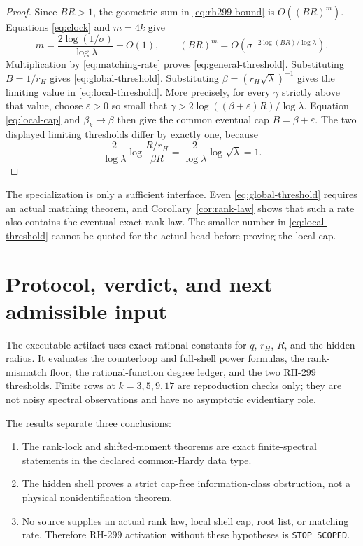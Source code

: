 \documentclass[11pt]{article}
\theoremstyle{remark}
\begin{document}
\begin{proof}
Since $BR>1$, the geometric sum in \eqref{eq:rh299-bound} is
$O((BR)^m)$.  Equations \eqref{eq:clock} and $m=4k$ give
\begin{equation}\label{eq:clock-growth}
 m=\frac{2\log(1/\sigma)}{\log\lambda}+O(1),
 \qquad
 (BR)^m=O\!\left(
 \sigma^{-2\log(BR)/\log\lambda}
 \right).
\end{equation}
Multiplication by \eqref{eq:matching-rate} proves
\eqref{eq:general-threshold}.  Substituting $B=1/r_H$ gives
\eqref{eq:global-threshold}.  Substituting
$\beta=(r_H\sqrt\lambda)^{-1}$ gives the limiting value in
\eqref{eq:local-threshold}.  More precisely, for every $\gamma$ strictly
above that value, choose $\varepsilon>0$ so small that
$\gamma>2\log((\beta+\varepsilon)R)/\log\lambda$.  Equation
\eqref{eq:local-cap} and $\beta_k\to\beta$ then give the common eventual cap
$B=\beta+\varepsilon$.  The two displayed limiting thresholds differ by
exactly one, because
\begin{equation}\label{eq:threshold-gap}
 \frac{2}{\log\lambda}
 \log\frac{R/r_H}{\beta R}
 =\frac{2}{\log\lambda}\log\sqrt\lambda=1.
\end{equation}
\end{proof}

The specialization is only a sufficient interface.  Even
\eqref{eq:global-threshold} requires an actual matching theorem, and
Corollary~\ref{cor:rank-law} shows that such a rate also contains the
eventual exact rank law.  The smaller number in \eqref{eq:local-threshold}
cannot be quoted for the actual head before proving the local cap.

\section{Protocol, verdict, and next admissible input}

The executable artifact uses exact rational constants for $q$, $r_H$, $R$,
and the hidden radius.  It evaluates the counterloop and full-shell power
formulas, the rank-mismatch floor, the rational-function degree ledger, and
the two RH-299 thresholds.  Finite rows at $k=3,5,9,17$ are reproduction
checks only; they are not noisy spectral observations and have no
asymptotic evidentiary role.

The results separate three conclusions:
\begin{enumerate}
\item The rank-lock and shifted-moment theorems are exact finite-spectral
statements in the declared common-Hardy data type.
\item The hidden shell proves a strict cap-free information-class
obstruction, not a physical nonidentification theorem.
\item No source supplies an actual rank law, local shell cap, root list, or
matching rate.  Therefore RH-299 activation without these hypotheses is
\texttt{STOP\_SCOPED}.
\end{enumerate}
\end{document}
